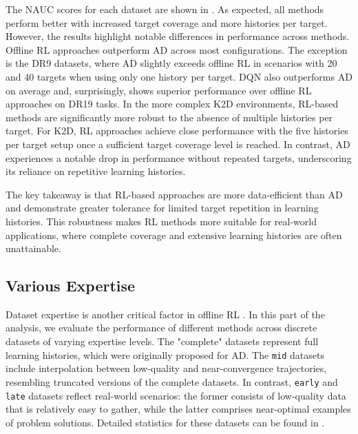 \documentclass{article} %
\begin{document}
The NAUC scores for each dataset are shown in . As expected, all methods perform better with increased target coverage and more histories per target. However, the results highlight notable differences in performance across methods. Offline RL approaches outperform AD across most configurations. The exception is the DR9 datasets, where AD slightly exceeds offline RL in scenarios with 20 and 40 targets when using only one history per target. DQN also outperforms AD on average and, surprisingly, shows superior performance over offline RL approaches on DR19 tasks. In the more complex K2D environments, RL-based methods are significantly more robust to the absence of multiple histories per target. For K2D, RL approaches achieve close performance with the five histories per target setup once a sufficient target coverage level is reached. In contrast, AD experiences a notable drop in performance without repeated targets, underscoring its reliance on repetitive learning histories.

The key takeaway is that RL-based approaches are more data-efficient than AD and demonstrate greater tolerance for limited target repetition in learning histories. This robustness makes RL methods more suitable for real-world applications, where complete coverage and extensive learning histories are often unattainable.

\subsection{Various Expertise}
\label{discrete-expertise}
Dataset expertise is another critical factor in offline RL \citep{schweighofer2021dataset}. In this part of the analysis, we evaluate the performance of different methods across discrete datasets of varying expertise levels. The "complete" datasets represent full learning histories, which were originally proposed for AD. The \texttt{mid} datasets include interpolation between low-quality and near-convergence trajectories, resembling truncated versions of the complete datasets. In contrast, \texttt{early} and \texttt{late} datasets reflect real-world scenarios: the former consists of low-quality data that is relatively easy to gather, while the latter comprises near-optimal examples of problem solutions. Detailed statistics for these datasets can be found in .
\end{document}
